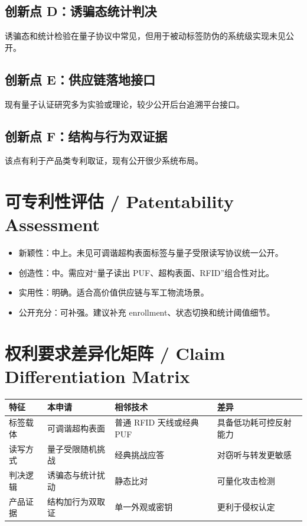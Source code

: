 ﻿\documentclass[12pt,a4paper]{article}
\begin{document}
\subsection{创新点 D：诱骗态统计判决}
诱骗态和统计检验在量子协议中常见，但用于被动标签防伪的系统级实现未见公开。

\subsection{创新点 E：供应链落地接口}
现有量子认证研究多为实验或理论，较少公开后台追溯平台接口。

\subsection{创新点 F：结构与行为双证据}
该点有利于产品类专利取证，现有公开很少系统布局。

\section{可专利性评估 / Patentability Assessment}
\begin{itemize}
\item 新颖性：中上。未见可调谐超构表面标签与量子受限读写协议统一公开。
\item 创造性：中。需应对“量子读出 PUF、超构表面、RFID”组合性对比。
\item 实用性：明确。适合高价值供应链与军工物流场景。
\item 公开充分：可补强。建议补充 enrollment、状态切换和统计阈值细节。
\end{itemize}

\section{权利要求差异化矩阵 / Claim Differentiation Matrix}
\begin{tabular}{|p{2.8cm}|p{3.8cm}|p{3.8cm}|p{2.8cm}|}
\hline
特征 & 本申请 & 相邻技术 & 差异 \\
\hline
标签载体 & 可调谐超构表面 & 普通 RFID 天线或经典 PUF & 具备低功耗可控反射能力 \\
\hline
读写方式 & 量子受限随机挑战 & 经典挑战应答 & 对窃听与转发更敏感 \\
\hline
判决逻辑 & 诱骗态与统计扰动 & 静态比对 & 可量化攻击检测 \\
\hline
产品证据 & 结构加行为双取证 & 单一外观或密钥 & 更利于侵权认定 \\
\hline
\end{tabular}
\end{document}
